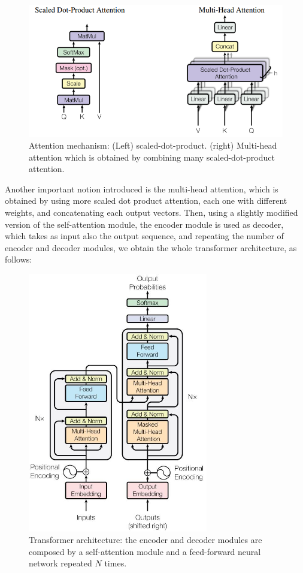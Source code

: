 \begin{figure}[H]
    \centering
    \includegraphics[width=\textwidth]{./images/2_attention}
    \caption{Attention mechanism: (Left) scaled-dot-product. (right) Multi-head attention which is obtained by combining many scaled-dot-product attention.}
    \label{fig:figure-encoder-structure}
\end{figure}

Another important notion introduced is the multi-head attention, which is obtained by using more scaled dot product attention, each one with different weights, and concatenating each output vectors.
Then, using a slightly modified version of the self-attention module, the encoder module is used as decoder, which takes as input also the output sequence, and repeating the number of encoder and decoder modules, we obtain the whole transformer architecture, as follows:

\begin{figure}[H]
    \centering
    \includegraphics[width=0.7\textwidth]{./images/2_transformer}
    \caption{Transformer architecture: the encoder and decoder modules are composed by a self-attention module and a feed-forward neural network repeated $N$ times.}
    \label{fig:figure-transformer-architecture}
\end{figure}

